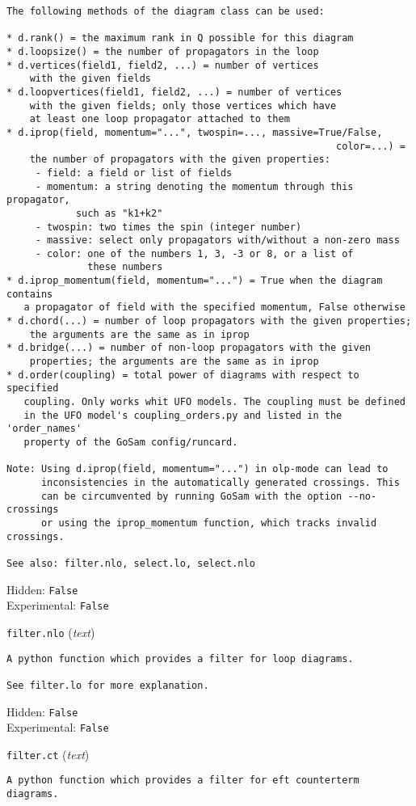 \begin{basedescript}{\desclabelstyle{\pushlabel}}
\begin{verbatim}
The following methods of the diagram class can be used:

* d.rank() = the maximum rank in Q possible for this diagram
* d.loopsize() = the number of propagators in the loop
* d.vertices(field1, field2, ...) = number of vertices
    with the given fields
* d.loopvertices(field1, field2, ...) = number of vertices
    with the given fields; only those vertices which have
    at least one loop propagator attached to them
* d.iprop(field, momentum="...", twospin=..., massive=True/False,
                                                         color=...) =
    the number of propagators with the given properties:
     - field: a field or list of fields
     - momentum: a string denoting the momentum through this propagator,
            such as "k1+k2"
     - twospin: two times the spin (integer number)
     - massive: select only propagators with/without a non-zero mass
     - color: one of the numbers 1, 3, -3 or 8, or a list of
              these numbers
* d.iprop_momentum(field, momentum="...") = True when the diagram contains
   a propagator of field with the specified momentum, False otherwise
* d.chord(...) = number of loop propagators with the given properties;
    the arguments are the same as in iprop
* d.bridge(...) = number of non-loop propagators with the given
    properties; the arguments are the same as in iprop
* d.order(coupling) = total power of diagrams with respect to specified
   coupling. Only works whit UFO models. The coupling must be defined
   in the UFO model's coupling_orders.py and listed in the 'order_names'
   property of the GoSam config/runcard.

Note: Using d.iprop(field, momentum="...") in olp-mode can lead to
      inconsistencies in the automatically generated crossings. This
      can be circumvented by running GoSam with the option --no-crossings
      or using the iprop_momentum function, which tracks invalid crossings.

See also: filter.nlo, select.lo, select.nlo
\end{verbatim}
Hidden: \verb|False|
\\Experimental: \verb|False|
\\\item[\colorbox{gray!30}{\texttt{filter.nlo}}] (\textit{text})
\begin{verbatim}
A python function which provides a filter for loop diagrams.

See filter.lo for more explanation.
\end{verbatim}
Hidden: \verb|False|
\\Experimental: \verb|False|
\\\item[\colorbox{gray!30}{\texttt{filter.ct}}] (\textit{text})
\begin{verbatim}
A python function which provides a filter for eft counterterm diagrams.


\end{verbatim}
\end{basedescript}
